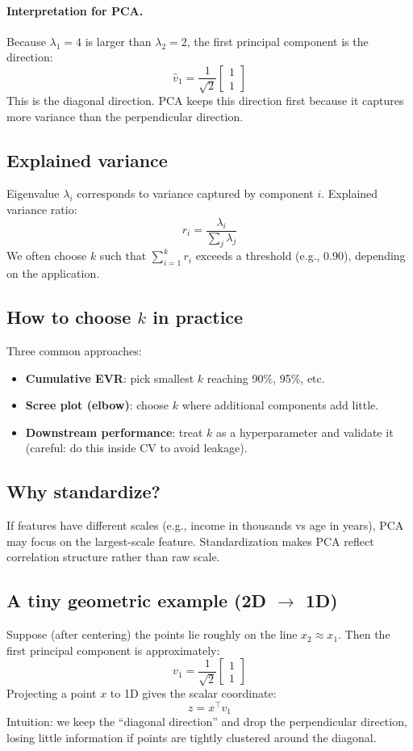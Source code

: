 \documentclass[11pt]{article}
\begin{document}
\paragraph{Interpretation for PCA.}
Because $\lambda_1 = 4$ is larger than $\lambda_2 = 2$, the first principal component is the direction:
\[
  \hat v_1 = \frac{1}{\sqrt{2}}
  \begin{bmatrix}
    1\\1
  \end{bmatrix}
\]
This is the diagonal direction. PCA keeps this direction first because it captures more variance than the perpendicular direction.

\subsection{Explained variance}
Eigenvalue $\lambda_i$ corresponds to variance captured by component $i$.
Explained variance ratio:
\[
  r_i = \frac{\lambda_i}{\sum_j \lambda_j}
\]
We often choose $k$ such that $\sum_{i=1}^k r_i$ exceeds a threshold (e.g., 0.90), depending on the application.

\subsection{How to choose $k$ in practice}
Three common approaches:
\begin{itemize}[leftmargin=*]
  \item \textbf{Cumulative EVR}: pick smallest $k$ reaching 90\%, 95\%, etc.
  \item \textbf{Scree plot (elbow)}: choose $k$ where additional components add little.
  \item \textbf{Downstream performance}: treat $k$ as a hyperparameter and validate it (careful: do this inside CV to avoid leakage).
\end{itemize}

\subsection{Why standardize?}
If features have different scales (e.g., income in thousands vs age in years), PCA may focus on the largest-scale feature. Standardization makes PCA reflect correlation structure rather than raw scale.

\subsection{A tiny geometric example (2D $\rightarrow$ 1D)}
Suppose (after centering) the points lie roughly on the line $x_2 \approx x_1$.
Then the first principal component is approximately:
\[
  v_1 = \frac{1}{\sqrt{2}}\begin{bmatrix}1\\1\end{bmatrix}
\]
Projecting a point $x$ to 1D gives the scalar coordinate:
\[
  z = x^\top v_1
\]
Intuition: we keep the ``diagonal direction'' and drop the perpendicular direction, losing little information if points are tightly clustered around the diagonal.
\end{document}
